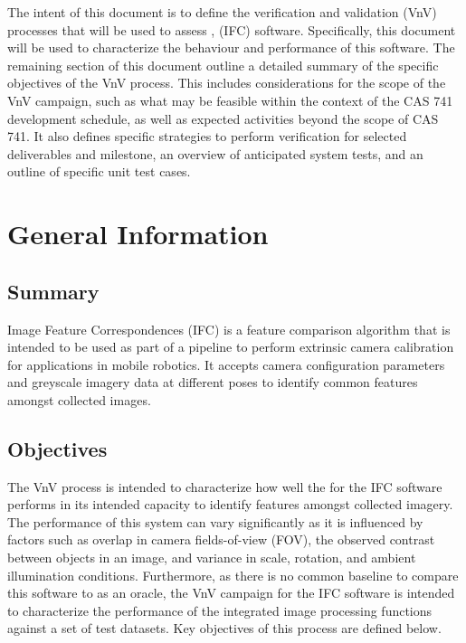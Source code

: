 \documentclass[12pt, titlepage]{article}
\begin{document}
\newpage


The intent of this document is to define the verification and validation (VnV) processes
that will be used to assess \progname, (IFC) software. Specifically, this document will be used to 
characterize the behaviour and performance of this software. The remaining section of this document 
outline a detailed summary of the specific objectives of the VnV process. This includes considerations 
for the scope of the VnV campaign, such as what may be feasible within the context of the CAS 741 
development schedule, as well as expected activities beyond the scope of CAS 741.
It also defines specific strategies to perform verification for selected deliverables and milestone, 
an overview of anticipated system tests, and an outline of specific unit test cases.

\section{General Information}

\subsection{Summary}
Image Feature Correspondences (IFC) is a feature comparison algorithm that is intended 
to be used as part of a pipeline to perform extrinsic camera calibration for 
applications in mobile robotics. It accepts camera configuration parameters and greyscale imagery data at 
different poses to identify common features amongst collected images. 

\subsection{Objectives}
The VnV process is intended to characterize how well the for the IFC software performs in its 
intended capacity to identify features amongst collected imagery. The performance of this system 
can vary significantly as it is influenced by factors such as overlap in camera fields-of-view (FOV),
the observed contrast between objects in an image, and variance in scale, rotation, and ambient 
illumination conditions. Furthermore, as there is no common baseline to compare this software to as 
an oracle, the VnV campaign for the IFC software is intended to characterize the performance of the 
integrated image processing functions against a set of test datasets. Key objectives of this process 
are defined below.
\end{document}
